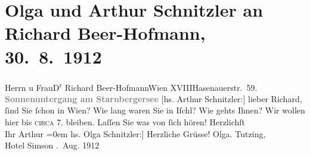 

         
         \renewcommand{\erwaehntePersonen}{Personen: Richard Beer-Hofmann, Paula Beer-Hofmann, Olga Schnitzler}
         \renewcommand{\erwaehnteOrte}{Orte: Bad Ischl, Hasenauerstraße, Hotel Simson, Starnberger See, Tutzing, Wien, XVIII., Währing}
         \renewcommand{\erwaehnteWerke}{}
               \section[Olga und Arthur Schnitzler an Richard Beer-Hofmann, 30. 8. 1912]{ Olga und Arthur Schnitzler an Richard Beer-Hofmann, 30. 8. 1912}\nopagebreak{}\rehead{ }\begin{ledgroupsized}[t]{13cm}\normalsize\beginnumbering \toendnotes[C]{\smallbreak\pagebreak[2]} 
\pstart{}{\pb}Herrn u Frau\pend{}\pstart{}D\textsuperscript{r} Richard Beer-Hofmann\pend{}\pstart{}Wien XVIII\pend{}\pstart{}Hasenauerstr. 59.\pend{}{\bigskip}\pstart
           \noindent{}\centering{}{\pb}\textcolor{gray}{\textbf{Sonnenuntergang am Starnbergersee}}\pend
           \pstart
           {\pb}{[}hs. Arthur Schnitzler:{]} lieber Richard, ſind Sie ſchon in Wien? Wie lang waren Sie in Iſchl? Wie
               gehts Ihnen? Wir wollen hier bis \textsc{circa}{ }7. bleiben. Laſſen Sie  was von ſich
               hören!\pend
           \pstart
           Herzlichſt{\\[\baselineskip]}Ihr \spacefill\mbox{Arthur}\pend
           \leftskip=0em{}\pstart
           \noindent{}{[}hs. Olga Schnitzler:{]} Herzliche Grüsse!\pend
           \pstart \spacefill\mbox{Olga.}\pend{}\pstart
           \noindent{}Tutzing,{\\}Hotel Simson\pend
           . Aug. 1912\pend
           
         
         \endnumbering{}\end{ledgroupsized}  \newcommand{\dateiname}{L02087}\newcommand{\titel}{Olga und Arthur Schnitzler an Richard Beer-Hofmann, 30. 8. 1912}\newcommand{\editorInnen}{Martin Anton Müller und Gerd-Hermann Susen}
      